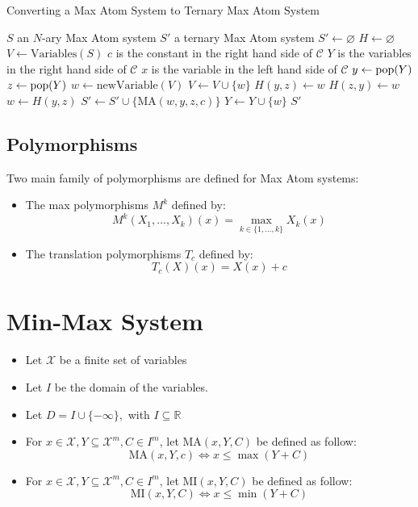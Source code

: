 \begin{algorithm}
	\caption{Converting a Max Atom System to Ternary Max Atom System}\label{alg:MaxAtomToTernaryMaxAtom}
	\begin{algorithmic}
		\Require $S$ an $N$-ary Max Atom system
		\Ensure $S'$ a ternary Max Atom system  
		\State $S'\leftarrow \varnothing$
		\State $H\leftarrow\varnothing$ 
		\State $V\leftarrow \text{Variables}(S)$  
		\State $c$ is the constant in the right hand side of $\mathcal{C}$
		\State $Y$ is the variables in the right hand side of $\mathcal{C}$
		\State $x$ is the variable in the left hand side of $\mathcal{C}$
				\State $y\leftarrow \operatorname{pop}(Y)$
				\State $z\leftarrow \operatorname{pop}(Y)$
					\State $w\leftarrow \text{newVariable}(V)$
					\State $V\leftarrow V\cup\{w\}$
					\State $H(y,z)\leftarrow w$
					\State $H(z,y)\leftarrow w$
				\EndIf
				\State $w\leftarrow H(y,z)$
				\State $S'\leftarrow S'\cup\{\text{MA}(w,y,z,c)\}$
				\State $Y\leftarrow Y\cup\{w\}$
			\EndWhile
		\EndFor
		\State \Return $S'$
	\end{algorithmic}
\end{algorithm}
\subsection{Polymorphisms}
Two main family of polymorphisms are defined for Max Atom systems:
\begin{itemize}
	\item The max polymorphisms $M^{k}$ defined by:
	$$
	M^{k}(X_1,\dots,X_k)(x) = \max_{k\in\{1,\dots,k\}} X_k(x)
	$$
	\item The translation polymorphisms $T_{c}$ defined by:
	$$
	T_c(X)(x)=X(x)+c
	$$
\end{itemize}

\section{Min-Max System}

\begin{itemize}
	\item Let $\mathcal{X}$ be a finite set of variables
	\item Let $I$ be the domain of the variables.
	\item Let $D=I\cup \{-\infty\},$ with $I\subseteq \mathbb{R}$  
	\item For $x\in \mathcal{X},Y\subseteq\mathcal{X}^m,C\in I^m$, let $\text{MA}(x,Y,C)$ be defined as follow:
	$$
	\text{MA}(x,Y,c)\iff x\le \max (Y+C)
	$$
	\item For $x\in \mathcal{X},Y\subseteq\mathcal{X}^m,C\in I^m$, let $\text{MI}(x,Y,C)$ be defined as follow:
	$$
	\text{MI}(x,Y,C)\iff x\le \min (Y+C)
	$$
\end{itemize}

